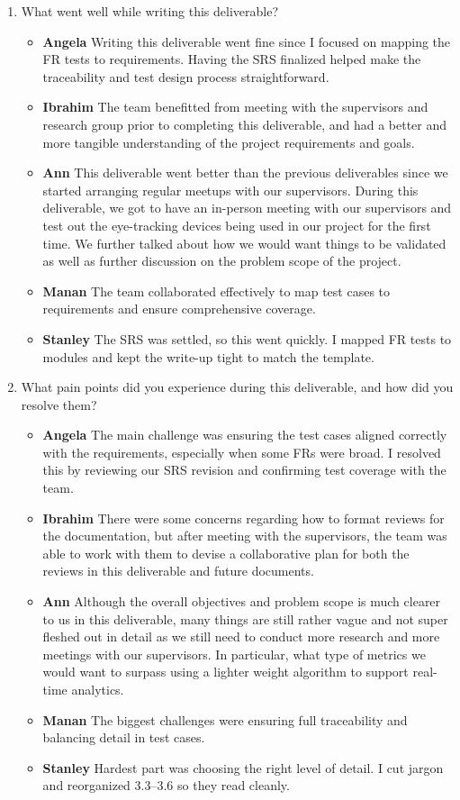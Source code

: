 \documentclass[12pt, titlepage]{article}
\begin{document}
\begin{enumerate}
  \item What went well while writing this deliverable? 
  \begin{itemize}
      \item \textbf{Angela} Writing this deliverable went fine since I focused on mapping the FR tests to requirements. Having the SRS finalized helped make the traceability and test design process straightforward.  
      \item \textbf{Ibrahim} The team benefitted from meeting with the supervisors and research group prior to completing this deliverable, and had a better and more tangible understanding of the project requirements and goals.
      \item \textbf{Ann} This deliverable went better than the previous deliverables since we started arranging regular meetups with our supervisors. During this deliverable, we got to have an in-person meeting with our supervisors and test out the eye-tracking devices being used in our project for the first time. We further talked about how we would want things to be validated as well as further discussion on the problem scope of the project.
      \item \textbf{Manan} The team collaborated effectively to map test cases to requirements and ensure comprehensive coverage.
      \item \textbf{Stanley} The SRS was settled, so this went quickly. I mapped FR tests to modules and kept the write-up tight to match the template.
    \end{itemize}
  \item What pain points did you experience during this deliverable, and how
    did you resolve them?
  \begin{itemize}
      \item \textbf{Angela} The main challenge was ensuring the test cases aligned correctly with the requirements, especially when some FRs were broad. I resolved this by reviewing our SRS revision and confirming test coverage with the team.
      \item \textbf{Ibrahim} There were some concerns regarding how to format reviews for the documentation, but after meeting with the supervisors, the team was able to work with them to devise a collaborative plan for both the reviews in this deliverable and future documents.
      \item \textbf{Ann} Although the overall objectives and problem scope is much clearer to us in this deliverable, many things are still rather vague and not super fleshed out in detail as we still need to conduct more research and more meetings with our supervisors. In particular, what type of metrics we would want to surpass using a lighter weight algorithm to support real-time analytics.
      \item \textbf{Manan} The biggest challenges were ensuring full traceability and balancing detail in test cases.
      \item \textbf{Stanley} Hardest part was choosing the right level of detail. I cut jargon and reorganized 3.3–3.6 so they read cleanly.
    \end{itemize}


\end{enumerate}
\end{document}
